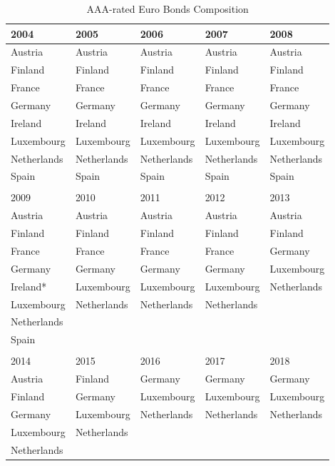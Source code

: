 \begin{table}[!ht]
\centering
\caption{AAA-rated Euro Bonds Composition}
\label{tab:ratings}
\begin{adjustbox}{width=0.65\textwidth}
\centering
\begin{threeparttable}
\begin{tabular}[t]{lllll}
\toprule
2004 & 2005 & 2006 & 2007 & 2008\\
\midrule
Austria & Austria & Austria & Austria & Austria\\
Finland & Finland & Finland & Finland & Finland\\
France & France & France & France & France\\
Germany & Germany & Germany & Germany & Germany\\
Ireland & Ireland & Ireland & Ireland & Ireland\\
Luxembourg & Luxembourg & Luxembourg & Luxembourg & Luxembourg\\
Netherlands & Netherlands & Netherlands & Netherlands & Netherlands\\
Spain & Spain & Spain & Spain & Spain\\
 &  &  &  & \\
\midrule
2009 & 2010 & 2011 & 2012 & 2013\\
\midrule
Austria & Austria & Austria & Austria & Austria\\
Finland & Finland & Finland & Finland & Finland\\
France & France & France & France & Germany\\
Germany & Germany & Germany & Germany & Luxembourg\\
Ireland* & Luxembourg & Luxembourg & Luxembourg & Netherlands\\
Luxembourg & Netherlands & Netherlands & Netherlands & \\
Netherlands &  &  &  & \\
Spain &  &  &  & \\
 &  &  &  & \\
\midrule
2014 & 2015 & 2016 & 2017 & 2018\\
\midrule
Austria & Finland & Germany & Germany & Germany\\
Finland & Germany & Luxembourg & Luxembourg & Luxembourg\\
Germany & Luxembourg & Netherlands & Netherlands & Netherlands\\
Luxembourg & Netherlands &  &  & \\
Netherlands &  &  &  & \\

\end{tabular}
\end{threeparttable}
\end{adjustbox}
\end{table}
